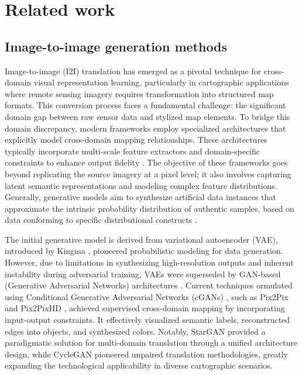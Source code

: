 \section{Related work}
\subsection{Image-to-image generation methods}
Image-to-image (I2I) translation has emerged as a pivotal technique for cross-domain visual representation learning, particularly in cartographic applications where remote sensing imagery requires transformation into structured map formats. This conversion process faces a fundamental challenge: the significant domain gap between raw sensor data and stylized map elements. To bridge this domain discrepancy, modern frameworks employ specialized architectures that explicitly model cross-domain mapping relationships. These architectures typically incorporate multi-scale feature extractors and domain-specific constraints to enhance output fidelity \cite{Pang2021ImagetoImageTranslationMethods}. The objective of these frameworks goes beyond replicating the source imagery at a pixel level; it also involves capturing latent semantic representations and modeling complex feature distributions. Generally, generative models aim to synthesize artificial data instances that approximate the intrinsic probability distribution of authentic samples, based on data conforming to specific distributional constructs \cite{A.Oussidi2018Deepgenerativemodels}.

The initial generative model is derived from variational autoencoder (VAE), introduced by Kingma \cite{Kingma2013Autoencodingvariationalbayes}, pioneered probabilistic modeling for data generation. However, due to limitations in synthesizing high-resolution outputs and inherent instability during adversarial training, VAEs were superseded by GAN-based (Generative Adversarial Networks) architectures \cite{Goodfellow2014GenerativeAdversarialNets}. Current techniques ormulated using Conditional Generative Adversarial Networks (cGANs) \cite{Wang2018HighResolutionImageSynthesis}, such as Pix2Pix \cite{Isola2017ImagetoImageTranslationConditional} and Pix2PixHD \cite{Wang2018HighResolutionImageSynthesis},  achieved supervised cross-domain mapping by incorporating input-output constraints. It effectively visualized semantic labels, reconstructed edges into objects, and synthesized colors. Notably, StarGAN \cite{Choi2018StarGANUnifiedGenerative} provided a paradigmatic solution for multi-domain translation through a unified architecture design, while CycleGAN \cite{Zhu2017UnpairedImagetoImageTranslation} pioneered unpaired translation methodologies, greatly expanding the technological applicability in diverse cartographic scenarios.

